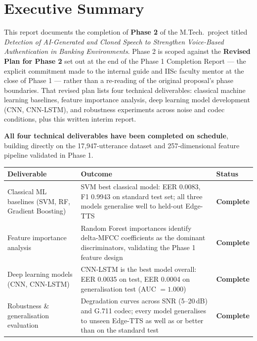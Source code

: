 \documentclass[12pt,a4paper]{report}
\newcommand{\statuscomplete}{\colorbox{statusgreen}{\color{white}\textbf{\small Complete}}}
\begin{document}
\chapter{Executive Summary}

This report documents the completion of \textbf{Phase 2} of the M.Tech.\ project titled
\textit{Detection of AI-Generated and Cloned Speech to Strengthen Voice-Based Authentication
in Banking Environments}. Phase 2 is scoped against the \textbf{Revised Plan for Phase 2}
set out at the end of the Phase 1 Completion Report --- the explicit commitment made to the
internal guide and IISc faculty mentor at the close of Phase 1 --- rather than a re-reading of
the original proposal's phase boundaries. That revised plan lists four technical deliverables:
classical machine learning baselines, feature importance analysis, deep learning model
development (CNN, CNN-LSTM), and robustness experiments across noise and codec conditions,
plus this written interim report.

\textbf{All four technical deliverables have been completed on schedule}, building directly
on the 17{,}947-utterance dataset and 257-dimensional feature pipeline validated in Phase 1.

\medskip
\begin{center}
\begin{tabular}{L{4.2cm}L{6.8cm}C{2cm}}
  \toprule
  \color{white}\textbf{Deliverable} &
  \color{white}\textbf{Outcome} &
  \color{white}\textbf{Status} \\
  \midrule
  Classical ML baselines (SVM, RF, Gradient Boosting) &
  SVM best classical model: EER 0.0083, F1 0.9943 on standard test set; all three
  models generalise well to held-out Edge-TTS &
  \statuscomplete \\[4pt]
  Feature importance analysis &
  Random Forest importances identify delta-MFCC coefficients as the dominant
  discriminators, validating the Phase 1 feature design &
  \statuscomplete \\[4pt]
  Deep learning models (CNN, CNN-LSTM) &
  CNN-LSTM is the best model overall: EER 0.0035 on test, EER 0.0004 on
  generalisation test (AUC $=1.000$) &
  \statuscomplete \\[4pt]
  Robustness \& generalisation evaluation &
  Degradation curves across SNR (5--20\,dB) and G.711 codec; every model
  generalises to unseen Edge-TTS as well as or better than on the standard test &
  \statuscomplete \\
  \bottomrule
\end{tabular}
\end{center}
\end{document}
